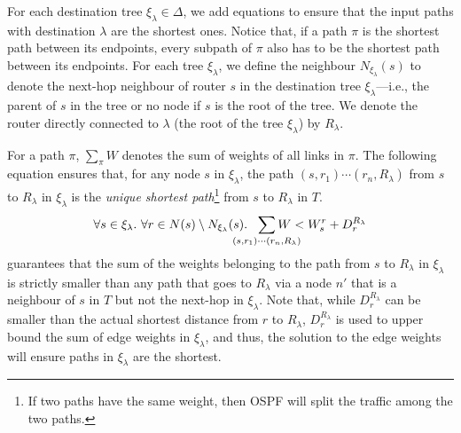 For each destination tree $\xi_\lambda\in\Delta$, we add equations to ensure 
that the input paths with destination $\lambda$ are the shortest ones.
Notice that, if a path $\pi$
is the shortest path between its endpoints, every 
subpath of $\pi$ also has to be the shortest path between its endpoints.
For each tree $\xi_\lambda$, we define the neighbour
 $N_{\xi_\lambda}(s)$ to denote the 
next-hop neighbour of router $s$ in the destination tree $\xi_\lambda$---i.e., the parent
of $s$ in the tree or no node if $s$ is the root of the tree. We denote the
router directly connected to $\lambda$ (the root of the tree $\xi_\lambda$) by $R_\lambda$.

For a path $\pi$, 
$\sum_{\pi} W$ denotes the sum of weights of all 
links in $\pi$. 
The following equation ensures that, for any node $s$ in 
$\xi_\lambda$, 
the path $(s,r_1)\cdots (r_n,R_\lambda)$ from $s$ to $R_\lambda$ 
in $\xi_\lambda$ is the 
\emph{unique shortest path}\footnote{
If two paths have the same weight, then OSPF will 
split the traffic among the two paths.
} from $s$ to $R_\lambda$ in $T$. 
\begin{equation} \label{eq:unique}
\forall s \in \xi_\lambda. ~
\forall r \in N(s) \setminus N_{\xi_\lambda}(s).~~
\sum_{\mathclap{\substack{(s,r_1)\cdots (r_n,R_\lambda)}}} 
W < W_{s}^{r}+ D_{r}^{R_\lambda}
\end{equation}
 guarantees that 
the sum of the weights belonging to the path 
from $s$ to $R_\lambda$ in $\xi_\lambda$ 
is strictly smaller than 
any path that goes to $R_\lambda$ via 
a node $n'$ that is a neighbour of $s$ in $T$ but not 
the next-hop in $\xi_\lambda$. Note that,
while $D_{r}^{R_\lambda}$ can be smaller 
than the actual shortest
distance from $r$ to $R_\lambda$, 
$D_{r}^{R_\lambda}$ is used to upper bound the sum of edge weights 
in $\xi_\lambda$, and  
thus, the solution to the edge weights will ensure 
paths in $\xi_\lambda$ are the shortest. 

